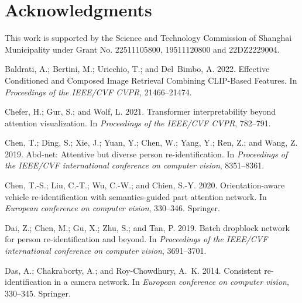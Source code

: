 \documentclass[letterpaper]{article} \usepackage{aaai23}  \usepackage{times}  \usepackage{helvet}  \usepackage{courier}  \usepackage[hyphens]{url}  \usepackage{graphicx} \urlstyle{rm} \def\UrlFont{\rm}  \usepackage{natbib}  \usepackage{caption} \frenchspacing  \setlength{\pdfpagewidth}{8.5in}  \setlength{\pdfpageheight}{11in}  \usepackage{algorithm}
\begin{document}
\section{Acknowledgments}
This work is supported by the Science and Technology Commission of Shanghai Municipality under Grant No. 22511105800, 19511120800 and 22DZ2229004.





\begin{small}
\begin{thebibliography}{65}
\providecommand{\natexlab}[1]{#1}

Baldrati, A.; Bertini, M.; Uricchio, T.; and Del~Bimbo, A. 2022.
\newblock Effective Conditioned and Composed Image Retrieval Combining
  CLIP-Based Features.
\newblock In \emph{Proceedings of the IEEE/CVF CVPR}, 21466--21474.

Chefer, H.; Gur, S.; and Wolf, L. 2021.
\newblock Transformer interpretability beyond attention visualization.
\newblock In \emph{Proceedings of the IEEE/CVF CVPR}, 782--791.

Chen, T.; Ding, S.; Xie, J.; Yuan, Y.; Chen, W.; Yang, Y.; Ren, Z.; and Wang,
  Z. 2019.
\newblock Abd-net: Attentive but diverse person re-identification.
\newblock In \emph{Proceedings of the IEEE/CVF international conference on
  computer vision}, 8351--8361.

Chen, T.-S.; Liu, C.-T.; Wu, C.-W.; and Chien, S.-Y. 2020.
\newblock Orientation-aware vehicle re-identification with semantics-guided
  part attention network.
\newblock In \emph{European conference on computer vision}, 330--346. Springer.

Dai, Z.; Chen, M.; Gu, X.; Zhu, S.; and Tan, P. 2019.
\newblock Batch dropblock network for person re-identification and beyond.
\newblock In \emph{Proceedings of the IEEE/CVF international conference on
  computer vision}, 3691--3701.

Das, A.; Chakraborty, A.; and Roy-Chowdhury, A.~K. 2014.
\newblock Consistent re-identification in a camera network.
\newblock In \emph{European conference on computer vision}, 330--345. Springer.


\end{thebibliography}
\end{small}
\end{document}
